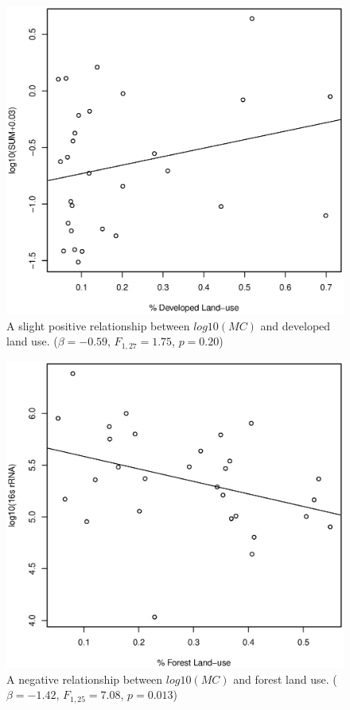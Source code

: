 \begin{figure}
\includegraphics[width=\textwidth]{figures/developed}
\caption{A slight positive relationship between $log10(MC)$ and developed land use. ($\beta=-0.59$, $F_{{1,27}}=1.75$, $p=0.20$)}
\label{fig:developed}
\end{figure}

\begin{figure}
\includegraphics[width=\textwidth]{figures/forest}
\caption{A negative relationship between $log10(MC)$ and forest land use. ($\beta=-1.42$, $F_{{1,25}}=7.08$, $p=0.013$)}
\label{fig:forest}
\end{figure}

